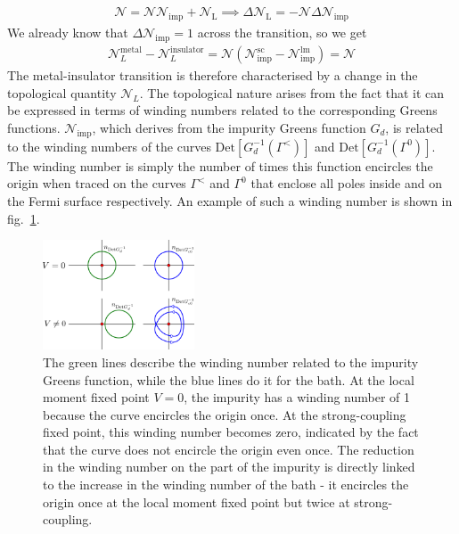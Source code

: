 \documentclass[reprint,hidelinks]{revtex4-2}
\begin{document}
\begin{widetext}
\begin{equation}
\begin{aligned}
	\mathcal{N} = \mathcal{N} \mathcal{N}_\text{imp} + \mathcal{N}_\text{L} \implies \Delta \mathcal{N}_\text{L} = - \mathcal{N} \Delta \mathcal{N}_\text{imp}
\end{aligned}\end{equation}
We already know that \(\Delta \mathcal{N}_\text{imp}=1\) across the transition, so we get
\begin{equation}\begin{aligned}
	\mathcal{N}_L^\text{metal} - \mathcal{N}_L^\text{insulator} = \mathcal{N}\left(\mathcal{N}_\text{imp}^\text{sc} - \mathcal{N}_\text{imp}^\text{lm}\right) = \mathcal{N}
\end{aligned}\end{equation}
The metal-insulator transition is therefore characterised by a change in the topological quantity \(\mathcal{N}_L\). The topological nature arises from the fact that it can be expressed in terms of winding numbers related to the corresponding Greens functions. \(\mathcal{N}_\text{imp}\), which derives from the impurity Greens function \(G_d\), is related to the winding numbers of the curves \(\text{Det}[G_d^{-1}(\Gamma^<)]\) and \(\text{Det}[G_d^{-1}(\Gamma^0)]\). The winding number is simply the number of times this function encircles the origin when traced on the curves \(\Gamma^<\) and \(\Gamma^0\) that enclose all poles inside and on the Fermi surface respectively. An example of such a winding number is shown in fig.~\ref{imp_winding}.
\begin{figure}[!htb]
	\centering
	\includegraphics[width=0.4\textwidth]{luttinger_top_change.png}
	\caption{The green lines describe the winding number related to the impurity Greens function, while the blue lines do it for the bath. At the local moment fixed point \(V=0\), the impurity has a winding number of 1 because the curve encircles the origin once. At the strong-coupling fixed point, this winding number becomes zero, indicated by the fact that the curve does not encircle the origin even once. The reduction in the winding number on the part of the impurity is directly linked to the increase in the winding number of the bath - it encircles the origin once at the local moment fixed point but twice at strong-coupling.}
	\label{imp_winding}
\end{figure}



\end{widetext}
\end{document}
